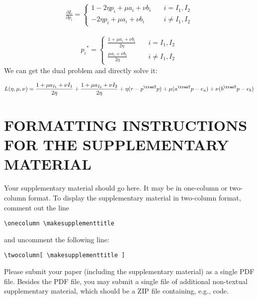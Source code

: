  \begin{equation}
\begin{split} 
\frac{\partial L}{\partial p_i} =  \left\{
\begin{aligned}
1 - 2\eta p_i +\mu a_i + \nu b_i \quad&  i = I_1, I_2\\
 - 2\eta p_i +\mu a_i + \nu b_i \quad&  i \neq I_1, I_2
\end{aligned}
\right.
 \end{split}
\label{eq:lang1}
\end{equation}

 \begin{equation}
\begin{split} 
{p_i}^{*} =  \left\{
\begin{aligned}
\frac{1+\mu a_i + \nu b_i}{2\eta} \quad&  i = I_1, I_2\\
\frac{\mu a_i + \nu b_i}{2\eta} \quad&  i \neq I_1, I_2
\end{aligned}
\right.
 \end{split}
\label{eq:lang1}
\end{equation}
We can get the dual problem and directly solve it:

\begin{equation}
L(\eta,\mu,\nu) = \frac{1+\mu a_{I_1} + \nu {I_1}}{2\eta}  +\frac{1+\mu a_{I_2} + \nu {I_2}}{2\eta}+ \eta(r - p^{\tranT}p )+\mu( a^{\tranT}p - e_a ) + \nu( b^{\tranT}p - e_b )
\end{equation}

\section{FORMATTING INSTRUCTIONS FOR THE SUPPLEMENTARY MATERIAL}

Your supplementary material should go here. It may be in one-column or two-column format. To display the supplementary material in two-column format, comment out the line
\begin{verbatim}
\onecolumn \makesupplementtitle
\end{verbatim}
and uncomment the following line:
\begin{verbatim}
\twocolumn[ \makesupplementtitle ]
\end{verbatim}

Please submit your paper (including the supplementary material) as a single PDF file. Besides the PDF file, you may submit a single file of additional non-textual supplementary material, which should be a ZIP file containing, e.g., code.

